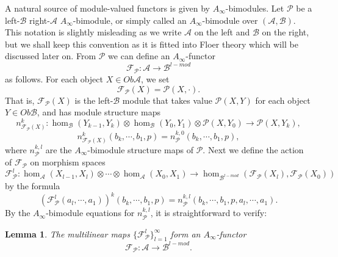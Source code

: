 \documentclass{amsart}
\newtheorem{lemma}[theorem]{Lemma}
\numberwithin{equation}{section}
\numberwithin{figure}{section}
\begin{document}
	A natural source of module-valued functors is given by $A_{\infty}$-bimodules. Let $\mathcal{P}$ be a left-$\mathcal{B}$ right-$\mathcal{A}$ $A_{\infty}$-bimodule, or simply called an $A_{\infty}$-bimodule over $(\mathcal{A}, \mathcal{B})$. This notation is slightly misleading as we write $\mathcal{A}$ on the left and $\mathcal{B}$ on the right, but we shall keep this convention as it is fitted into Floer theory which will be discussed later on. From $\mathcal{P}$ we can define an $A_{\infty}$-functor
\begin{equation}
\mathcal{F}_{\mathcal{P}}: \mathcal{A} \to \mathcal{B}^{l-mod}
\end{equation}
as follows. For each object $X \in Ob\mathcal{A}$, we set
\begin{equation*}
\mathcal{F}_{\mathcal{P}}(X) = \mathcal{P}(X, \cdot).
\end{equation*}
That is, $\mathcal{F}_{\mathcal{P}}(X)$ is the left-$\mathcal{B}$ module that takes value $\mathcal{P}(X, Y)$ for each object $Y \in Ob\mathcal{B}$, and has module structure maps
\begin{equation}
n^{k}_{\mathcal{F}_{\mathcal{P}}(X)}: \hom_{\mathcal{B}}(Y_{k-1}, Y_{k}) \otimes \hom_{\mathcal{B}}(Y_{0}, Y_{1}) \otimes \mathcal{P}(X, Y_{0}) \to \mathcal{P}(X, Y_{k}),
\end{equation}
\begin{equation}
n^{k}_{\mathcal{F}_{\mathcal{P}}(X)}(b_{k}, \cdots, b_{1}, p) = n^{k, 0}_{\mathcal{P}}(b_{k}, \cdots, b_{1}, p),
\end{equation}
where $n^{k, l}_{\mathcal{P}}$ are the $A_{\infty}$-bimodule structure maps of $\mathcal{P}$. Next we define the action of $\mathcal{F}_{\mathcal{P}}$ on morphism spaces
\begin{equation}
\mathcal{F}_{\mathcal{P}}^{l}: \hom_{\mathcal{A}}(X_{l-1}, X_{l}) \otimes \cdots \otimes \hom_{\mathcal{A}}(X_{0}, X_{1}) \to \hom_{\mathcal{B}^{l-mod}}(\mathcal{F}_{\mathcal{P}}(X_{l}), \mathcal{F}_{\mathcal{P}}(X_{0}))
\end{equation}
by the formula
\begin{equation}
(\mathcal{F}_{\mathcal{P}}^{l}(a_{l}, \cdots, a_{1}))^{k}(b_{k}, \cdots, b_{1}, p) = n^{k, l}_{\mathcal{P}}(b_{k}, \cdots, b_{1}, p, a_{l}, \cdots, a_{1}).
\end{equation}
By the $A_{\infty}$-bimodule equations for $n^{k, l}_{\mathcal{P}}$, it is straightforward to verify: \par

\begin{lemma}
	The multilinear maps $\{\mathcal{F}_{\mathcal{P}}^{l}\}_{l=1}^{\infty}$ form an $A_{\infty}$-functor
\begin{equation*}
\mathcal{F}_{\mathcal{P}}: \mathcal{A} \to \mathcal{B}^{l-mod}.
\end{equation*}
\end{lemma}
	
\end{document}
